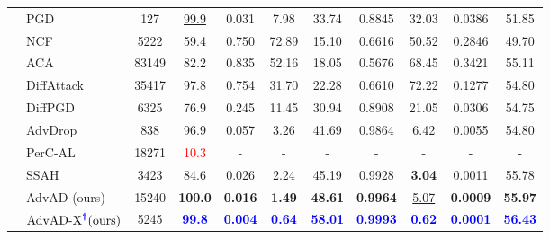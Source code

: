 \documentclass{article}
\begin{document}
\begin{table}[t]
{\begin{tabular}{clccccccccc}
        \midrule
                                    & PGD \cite{madry2018towards}           & 127       & \underline{99.9}      & 0.031     & 7.98      & 33.74     & 0.8845    & 32.03     & 0.0386    & 51.85 \\
                                    & NCF \cite{yuan2022natural}           & 5222      & 59.4      & 0.750     & 72.89     & 15.10     & 0.6616    & 50.52     & 0.2846    & 49.70 \\
                                    & ACA \cite{chen2024content}           & 83149     & 82.2      & 0.835     & 52.16     & 18.05     & 0.5676    & 68.45     & 0.3421    & 55.11 \\
                                    & DiffAttack \cite{chen2023diffusion}    & 35417     & 97.8      & 0.754     & 31.70     & 22.28     & 0.6610    & 72.22     & 0.1277    & 54.80 \\
                                    & DiffPGD \cite{xue2023diffusion}       & 6325      & 76.9      & 0.245     & 11.45     & 30.94     & 0.8908    & 21.05     & 0.0306    & 54.75 \\
                                    & AdvDrop \cite{duan2021advdrop}       & 838       & 96.9      & 0.057     & 3.26      & 41.69     & 0.9864    & 6.42      & 0.0055    & 54.80 \\
                                    & PerC-AL \cite{zhao2020towards}       & 18271     & \textcolor{red}{10.3}       & -         & -        & -          & -         & -         & -         & - \\
                                    & SSAH \cite{luo2022frequency}          & 3423      & 84.6      & \underline{0.026}     & \underline{2.24}      & \underline{45.19}     & \underline{0.9928}    & \textbf{3.04}      & \underline{0.0011}    & \underline{55.78} \\
        \cmidrule(lr){2-11}
                                    & AdvAD (ours)        & 15240     & \textbf{100.0}     & \textbf{0.016}     & \textbf{1.49}      & \textbf{48.61}     & \textbf{0.9964}    & \underline{5.07}      & \textbf{0.0009}    & \textbf{55.97} \\
                                    & $\text{AdvAD-X}^{\textcolor{blue}{\boldsymbol{\dag}}} \text{(ours)}$ & 5245    & \textcolor{blue}{\textbf{99.8}}      & \textcolor{blue}{\textbf{0.004}}     & \textcolor{blue}{\textbf{0.64}}      & \textcolor{blue}{\textbf{58.01}}     & \textcolor{blue}{\textbf{0.9993}}    & \textcolor{blue}{\textbf{0.62}}      & \textcolor{blue}{\textbf{0.0001}}    & \textcolor{blue}{\textbf{56.43}} \\


\end{tabular}}
\end{table}
\end{document}
